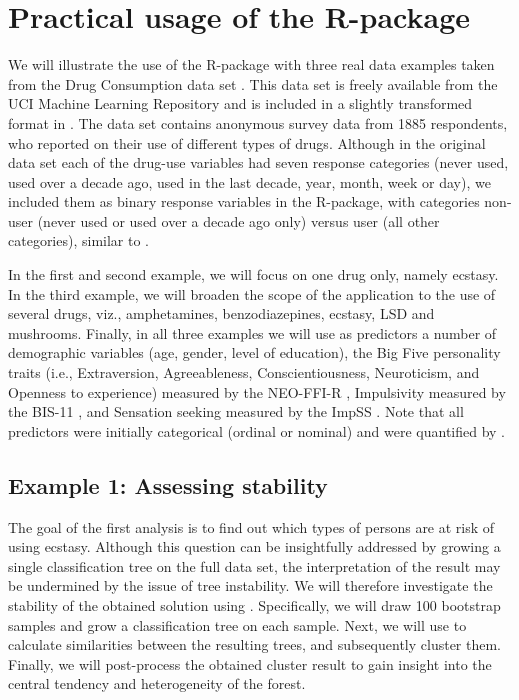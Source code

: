 \section{Practical usage of the R-package} \label{sec:illustrations}
We will illustrate the use of the R-package with three real data examples taken from the Drug Consumption data set \citep{Fehrman2017}. This data set is freely available from the UCI Machine Learning Repository \citep{Dheeru2017} and is included in a slightly transformed format in . The data set contains anonymous survey data from 1885 respondents, who reported on their use of different types of drugs. Although in the original data set each of the drug-use variables had seven response categories (never used, used over a decade ago, used in the last decade, year, month, week or day), we included them as binary response variables in the R-package, with categories non-user (never used or used over a decade ago only) versus user (all other categories), similar to \citet{Fehrman2017}.

In the first and second example, we will focus on one drug only, namely ecstasy. In the third example, we will broaden the scope of the application to the use of several drugs, viz., amphetamines, benzodiazepines, ecstasy, LSD and mushrooms.
Finally, in all three examples we will use as predictors a number of demographic variables (age, gender, level of education), the Big Five personality traits (i.e., Extraversion, Agreeableness, Conscientiousness, Neuroticism, and Openness to experience) measured by the NEO-FFI-R \citep{McCrae2004}, Impulsivity measured by the BIS-11 \citep{Patton1995}, and Sensation seeking measured by the ImpSS \citep{Zuckerman1993}. Note that all predictors were initially categorical (ordinal or nominal) and were quantified by \citet{Fehrman2017}.

\subsection{Example 1: Assessing stability} \label{sec:illustration1}
The goal of  the first  analysis is to find out which types of persons are at risk of using ecstasy. Although this question can be insightfully addressed by growing a single classification tree on the full data set, the interpretation of the result may be undermined by the issue of tree instability. We will therefore investigate the stability of the obtained solution using . 
Specifically, we will draw 100 bootstrap samples and grow a classification tree on each sample. Next, we will use  to calculate similarities between the resulting trees, and subsequently cluster them. Finally, we will post-process the obtained cluster result to gain insight into the central tendency and heterogeneity of the forest. 

